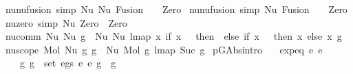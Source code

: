 \begin{isabellebody}
\isanewline
{\isacharbar}{\kern0pt}\ nu{\isacharunderscore}{\kern0pt}nu{\isacharunderscore}{\kern0pt}fusion{}\ {\isacharbrackleft}{\kern0pt}simp{\isacharbrackright}{\kern0pt}{\isacharcolon}{\kern0pt}\ {\isachardoublequoteopen}Nu\ {\isacharparenleft}{\kern0pt}Nu\ {\isacharparenleft}{\kern0pt}Fusion\ {}\ {}{\isacharparenright}{\kern0pt}{\isacharparenright}{\kern0pt}\ {\isasymsimeq}\ Zero{\isachardoublequoteclose}\isanewline
{\isacharbar}{\kern0pt}\ nu{\isacharunderscore}{\kern0pt}nu{\isacharunderscore}{\kern0pt}fusion{}\ {\isacharbrackleft}{\kern0pt}simp{\isacharbrackright}{\kern0pt}{\isacharcolon}{\kern0pt}\ {\isachardoublequoteopen}Nu\ {\isacharparenleft}{\kern0pt}Fusion\ {}\ {}{\isacharparenright}{\kern0pt}\ {\isasymsimeq}\ Zero{\isachardoublequoteclose}\isanewline
\isanewline
\isanewline
{\isacharbar}{\kern0pt}\ nu{\isacharunderscore}{\kern0pt}zero\ {\isacharbrackleft}{\kern0pt}simp{\isacharbrackright}{\kern0pt}{\isacharcolon}{\kern0pt}\ {\isachardoublequoteopen}Nu\ Zero\ {\isasymsimeq}\ Zero{\isachardoublequoteclose}\isanewline
\isanewline
\isanewline
{\isacharbar}{\kern0pt}\ nu{\isacharunderscore}{\kern0pt}comm{\isacharcolon}{\kern0pt}\ {\isachardoublequoteopen}Nu\ {\isacharparenleft}{\kern0pt}Nu\ g{\isacharparenright}{\kern0pt}\ {\isasymsimeq}\ Nu\ {\isacharparenleft}{\kern0pt}Nu\ {\isacharparenleft}{\kern0pt}lmap\ {\isacharparenleft}{\kern0pt}{\isasymlambda}x{\isachardot}{\kern0pt}\ if\ x\ {\isacharequal}{\kern0pt}\ {}\ then\ {}\ else\ if\ x\ {\isacharequal}{\kern0pt}\ {}\ then\ x\ else\ x{\isacharparenright}{\kern0pt}\ g{\isacharparenright}{\kern0pt}{\isacharparenright}{\kern0pt}{\isachardoublequoteclose}\isanewline
\isanewline
\isanewline
{\isacharbar}{\kern0pt}\ nu{\isacharunderscore}{\kern0pt}scope{\isacharcolon}{\kern0pt}\ {\isachardoublequoteopen}Mol\ {\isacharparenleft}{\kern0pt}Nu\ g{}{\isacharparenright}{\kern0pt}\ g{}\ {\isasymsimeq}\ Nu\ {\isacharparenleft}{\kern0pt}Mol\ g{}\ {\isacharparenleft}{\kern0pt}lmap\ Suc\ g{}{\isacharparenright}{\kern0pt}{\isacharparenright}{\kern0pt}{\isachardoublequoteclose}\isanewline
\isanewline
{\isacharbar}{\kern0pt}\ p{\isacharunderscore}{\kern0pt}GAbs{\isacharbrackleft}{\kern0pt}intro{\isacharbrackright}{\kern0pt}{\isacharcolon}{\kern0pt}\isanewline
\ \ \ {\isachardoublequoteopen}expeq\ e{}\ e{}\ {\isacharequal}{\kern0pt}{\isacharequal}{\kern0pt}{\isachargreater}{\kern0pt}\isanewline
\ \ \ \ {\isacharparenleft}{\kern0pt}{\isasymforall}{\isacharparenleft}{\kern0pt}g{}{\isacharcomma}{\kern0pt}\ g{}{\isacharparenright}{\kern0pt}\ {\isasymin}\ set\ {\isacharparenleft}{\kern0pt}egs\ e{}\ e{}{\isacharparenright}{\kern0pt}{\isachardot}{\kern0pt}\ g{}\ {\isasymsimeq}\ g{}{\isacharparenright}{\kern0pt}\ {\isacharequal}{\kern0pt}{\isacharequal}{\kern0pt}{\isachargreater}{\kern0pt}\isanewline

\end{isabellebody}
